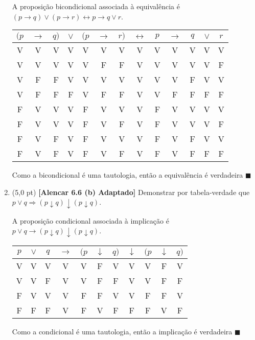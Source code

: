 \documentclass[12pt,a4paper,oneside]{article}
\begin{document}
\begin{enumerate}
	\vspace*{0.3cm}
	
	{\color{blue}
		
	A proposição bicondicional associada à equivalência é $(p \rightarrow q) \vee (p \rightarrow r) \leftrightarrow p \rightarrow q \vee r$.
	
	\begin{center}
		\begin{tabular}{|c|c|c|c|c|c|c|c|c|c|c|c|c|}
			\hline
			$(p$ & $\rightarrow$ & $q)$ & $\vee$ & $(p$ & $\rightarrow$ & $r)$ & $\leftrightarrow$ & $p$ & $\rightarrow$ & $q$ & $\vee$ & $r$  \\
			\hline
			V & V & V & V & V & V & V & V & V & V & V & V & V\\
			V & V & V & V & V & F & F & V & V & V & V & V & F\\
			V & F & F & V & V & V & V & V & V & V & F & V & V\\
			V & F & F & F & V & F & F & V & V & F & F & F & F\\
			F & V & V & V & F & V & V & V & F & V & V & V & V\\
			F & V & V & V & F & V & F & V & F & V & V & V & F\\
			F & V & F & V & F & V & V & V & F & V & F & V & V\\
			F & V & F & V & F & V & F & V & F & V & F & F & F\\
			\hline
		\end{tabular}
	\end{center}
	
	Como a bicondicional é uma tautologia, então a equivalência é verdadeira $\blacksquare$
	}
	
	\item (5,0 pt) {\bf [Alencar 6.6 (b) Adaptado]} Demonstrar por tabela-verdade que \\$p \vee q  \Rightarrow (p \downarrow q) \downarrow (p \downarrow q)$.
	
	\vspace*{0.3cm}
	
	{\color{blue}
		
		A proposição condicional associada à implicação é $p \vee q  \rightarrow (p \downarrow q) \downarrow (p \downarrow q)$.
		
		\begin{center}
			\begin{tabular}{|c|c|c|c|c|c|c|c|c|c|c|}
				\hline
				$p$ & $\vee$ & $q$ & $\rightarrow$ & $(p$ & $\downarrow$ & $q)$ & $\downarrow$ & $(p$ & $\downarrow$ & $q)$  \\
				\hline
				V & V & V & V & V & F & V & V & V & F & V \\
				V & V & F & V & V & F & F & V & V & F & F \\
				F & V & V & V & F & F & V & V & F & F & V \\
				F & F & F & V & F & V & F & F & F & V & F \\
				\hline
			\end{tabular}
		\end{center}
		
		Como a condicional é uma tautologia, então a implicação é verdadeira $\blacksquare$
	}
	


\end{enumerate}
\end{document}
